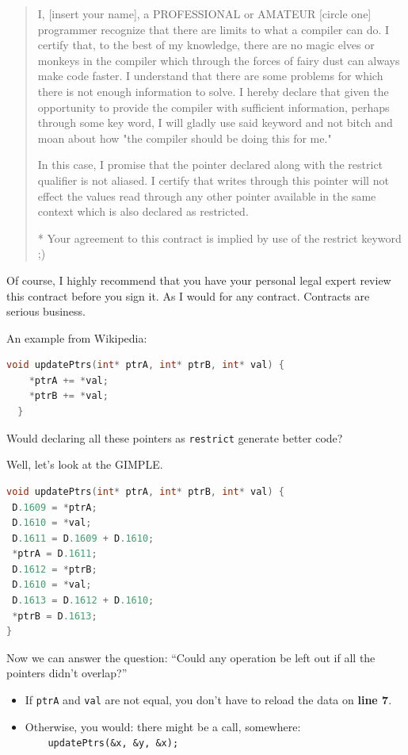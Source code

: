 \documentclass[a4paper]{report}
\begin{document}
\begin{quote}
I, [insert your name], a PROFESSIONAL or AMATEUR [circle one] programmer recognize that there are limits to what a compiler can do. I certify that, to the best of my knowledge, there are no magic elves or monkeys in the compiler which through the forces of fairy dust can always make code faster. I understand that there are some problems for which there is not enough information to solve. I hereby declare that given the opportunity to provide the compiler with sufficient information, perhaps through some key word, I will gladly use said keyword and not bitch and moan about how "the compiler should be doing this for me."

In this case, I promise that the pointer declared along with the restrict qualifier is not aliased. I certify that writes through this pointer will not effect the values read through any other pointer available in the same context which is also declared as restricted.

* Your agreement to this contract is implied by use of the restrict keyword ;)
\end{quote}

Of course, I highly recommend that you have your personal legal expert review this contract before you sign it. As I would for any contract. Contracts are serious business.

An example from Wikipedia:
\begin{lstlisting}[language=C]
  void updatePtrs(int* ptrA, int* ptrB, int* val) {
    *ptrA += *val;
    *ptrB += *val;
  }
\end{lstlisting}
Would declaring all these pointers as {\tt restrict} generate better code?

Well, let's look at the GIMPLE.
\begin{lstlisting}[language=C]
void updatePtrs(int* ptrA, int* ptrB, int* val) {
 D.1609 = *ptrA;
 D.1610 = *val;
 D.1611 = D.1609 + D.1610;
 *ptrA = D.1611;
 D.1612 = *ptrB;
 D.1610 = *val;
 D.1613 = D.1612 + D.1610;
 *ptrB = D.1613;
}
\end{lstlisting}

Now we can answer the question: ``Could any operation be left out if
all the pointers didn't overlap?''

\begin{itemize}
\item If {\tt ptrA} and {\tt val} are not equal, you don't have to
      reload the data on {\bf line 7}.
\item Otherwise, you would: there might be a call, somewhere:\\\verb+    updatePtrs(&x, &y, &x);+
\end{itemize}
\end{document}
